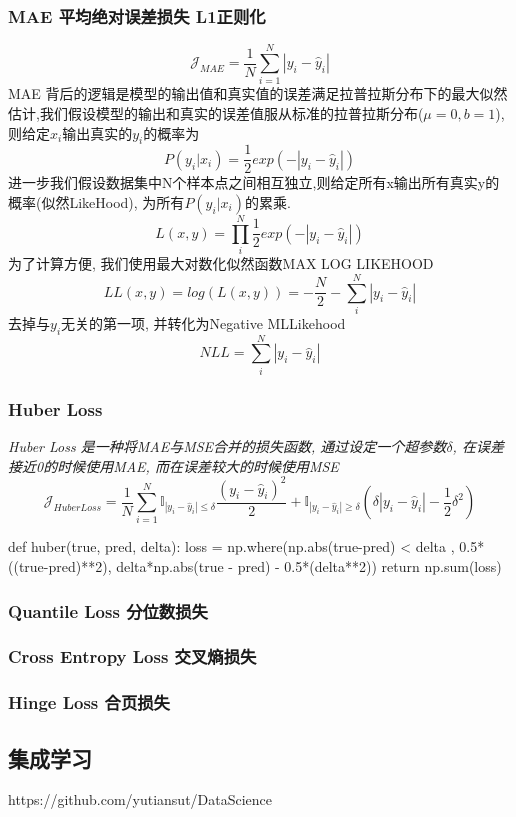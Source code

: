 \documentclass{scrartcl}
\numberwithin{equation}{section}
\begin{document}
\subsubsection{MAE 平均绝对误差损失 L1正则化}
$$\mathcal{J}_{MAE} =\frac{1}{N}\sum_{i=1}^N{\left\lvert y_i - \hat{y}_i\right\rvert } $$MAE 背后的逻辑是模型的输出值和真实值的误差满足拉普拉斯分布下的最大似然估计,我们假设模型的输出和真实的误差值服从标准的拉普拉斯分布($\mu=0, b=1$),则给定$x_i$输出真实的$y_i$的概率为$$P(y_i\vert x_i) = \frac{1}{2}exp(- \left\lvert y_i -  \hat{y}_i\right\rvert)$$进一步我们假设数据集中N个样本点之间相互独立,则给定所有x输出所有真实y的概率(似然LikeHood), 为所有$P(y_i\vert x_i)$的累乘. $$L(x,y) = \prod_i^N   \frac{1}{2}exp(- \left\lvert y_i -  \hat{y}_i\right\rvert)$$为了计算方便, 我们使用最大对数化似然函数MAX LOG LIKEHOOD$$LL(x,y) =  log(L(x,y)) = -\frac{N}{2} -\sum_i^N\left\lvert y_i - \hat{y}_i\right\rvert $$去掉与$y_i$无关的第一项, 并转化为Negative MLLikehood $$NLL=\sum_i^N\left\lvert y_i - \hat{y}_i\right\rvert $$
\subsubsection{Huber Loss}
\textsl{Huber Loss 是一种将MAE与MSE合并的损失函数, 通过设定一个超参数$\delta$, 在误差接近0的时候使用MAE, 而在误差较大的时候使用MSE $$\mathcal{J}_{Huber Loss} =\frac{1}{N}\sum_{i=1}^N \mathbb{I}_{\left\lvert y_i - \hat{y}_i\right\rvert \leq \delta} \frac{(y_i - \hat{y}_i)^2}{2} +\mathbb{I}_{\left\lvert y_i - \hat{y}_i\right\rvert \geq  \delta} (\delta \left\lvert y_i - \hat{y}_i\right\rvert -\frac{1}{2}\delta^2)$$}
\begin{python}
    def huber(true, pred, delta):
        loss = np.where(np.abs(true-pred) < delta , 0.5*((true-pred)**2), delta*np.abs(true - pred) - 0.5*(delta**2))
        return np.sum(loss)
\end{python}
\subsubsection{Quantile Loss 分位数损失}
\subsubsection{Cross Entropy Loss 交叉熵损失}
\subsubsection{Hinge Loss  合页损失}
\subsection{集成学习}
https://github.com/yutiansut/DataScience
\end{document}
